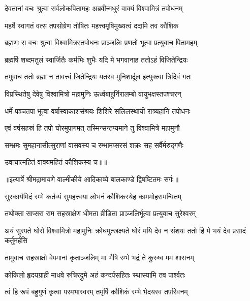 \twolineshloka
{देवतानां वचः श्रुत्वा सर्वलोकपितामहः}
{अब्रवीन्मधुरं वाक्यं विश्वामित्रं तपोधनम्} %

\twolineshloka
{महर्षे स्वागतं वत्स तपसोग्रेण तोषितः}
{महत्त्वमृषिमुख्यत्वं ददामि तव कौशिक} %

\twolineshloka
{ब्रह्मणः स वचः श्रुत्वा विश्वामित्रस्तपोधनः}
{प्राञ्जलिः प्रणतो भूत्वा प्रत्युवाच पितामहम्} %

\twolineshloka
{ब्रह्मर्षि शब्दमतुलं स्वार्जितैः कर्मभिः शुभैः}
{यदि मे भगवानाह ततोऽहं विजितेन्द्रियः} %

\twolineshloka
{तमुवाच ततो ब्रह्मा न तावत्त्वं जितेन्द्रियः}
{यतस्व मुनिशार्दूल इत्युक्त्वा त्रिदिवं गतः} %

\twolineshloka
{विप्रस्थितेषु देवेषु विश्वामित्रो महामुनिः}
{ऊर्ध्वबाहुर्निरालम्बो वायुभक्षस्तपश्चरन्} %

\twolineshloka
{धर्मे पञ्चतपा भूत्वा वर्षास्वाकाशसंश्रयः}
{शिशिरे सलिलस्थायी रात्र्यहानि तपोधनः} %

\twolineshloka
{एवं वर्षसहस्रं हि तपो घोरमुपागमत्}
{तस्मिन्सन्तप्यमाने तु विश्वामित्रे महामुनौ} %

\twolineshloka
{सम्भ्रमः सुमहानासीत्सुराणां वासवस्य च}
{रम्भामप्सरसं शक्रः सह सर्वैर्मरुद्गणैः} %

{उवाचात्महितं वाक्यमहितं कौशिकस्य च॥॥} %

\addtocounter{shlokacount}{1}


{॥इत्यार्षे श्रीमद्रामायणे वाल्मीकीये आदिकाव्ये बालकाण्डे द्विषष्टितमः सर्गः॥}


\twolineshloka
{सुरकार्यमिदं रम्भे कर्तव्यं सुमहत्त्वया}
{लोभनं कौशिकस्येह काममोहसमन्वितम्} %

\twolineshloka
{तथोक्ता साप्सरा राम सहस्राक्षेण धीमता}
{व्रीडिता प्राञ्जलिर्भूत्वा प्रत्युवाच सुरेश्वरम्} %

\threelineshloka
{अयं सुरपते घोरो विश्वामित्रो महामुनिः}
{क्रोधमुत्स्रक्ष्यते घोरं मयि देव न संशयः}
{ततो हि मे भयं देव प्रसादं कर्तुमर्हसि} %

\twolineshloka
{तामुवाच सहस्राक्षो वेपमानां कृताञ्जलिम्}
{मा भैषि रम्भे भद्रं ते कुरुष्व मम शासनम्} %

\twolineshloka
{कोकिलो हृदयग्राही माधवे रुचिरद्रुमे}
{अहं कन्दर्पसहितः स्थास्यामि तव पार्श्वतः} %

\twolineshloka
{त्वं हि रूपं बहुगुणं कृत्वा परमभास्वरम्}
{तमृषिं कौशिकं रम्भे भेदयस्व तपस्विनम्} %

